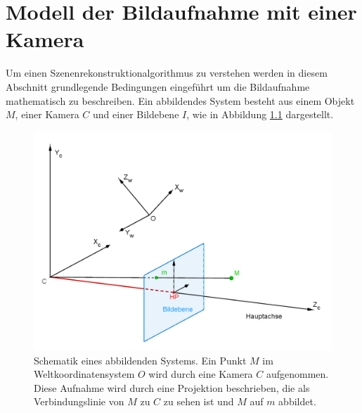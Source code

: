 \chapter{Modell der Bildaufnahme mit einer Kamera }
\label{sec:CameraModels}

Um einen Szenenrekonstruktionalgorithmus zu verstehen werden in diesem Abschnitt grundlegende  Bedingungen eingeführt um die Bildaufnahme mathematisch zu beschreiben. Ein abbildendes System besteht aus einem Objekt $M$, einer Kamera $C$ und einer Bildebene $I$, wie in Abbildung \ref{fig:PinholeCamera3D} dargestellt.\\



\begin{figure}[!htb]
	\centering
	\includegraphics[width=.8\linewidth]{images/PinholeCameraModell3D.png}
	\caption[Lochkameramodell]{Schematik eines abbildenden Systems. Ein Punkt $M$ im  Weltkoordinatensystem $O$ wird durch eine Kamera $C$ aufgenommen. Diese Aufnahme wird durch eine Projektion beschrieben, die als Verbindungslinie von $M$ zu $C$ zu sehen ist und $M$ auf $m$ abbildet.}
	\label{fig:PinholeCamera3D}
\end{figure}



